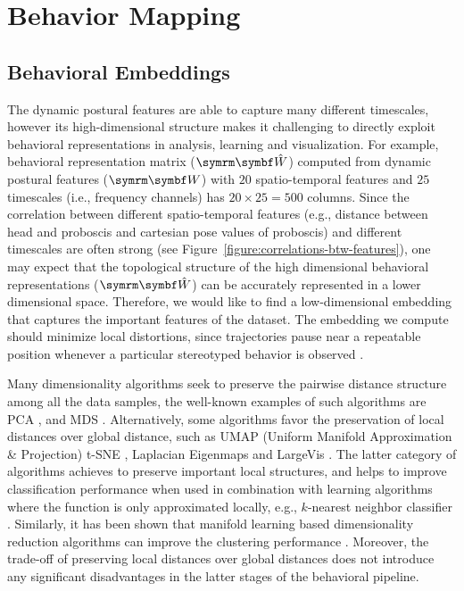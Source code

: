 \chapter{Behavior Mapping}

\section{Behavioral Embeddings}
The dynamic postural features are able to capture many different timescales, however its high-dimensional structure makes it challenging to directly exploit behavioral representations in analysis, learning and visualization.
For example, behavioral representation matrix ($\V{\hat{W}}$) computed from dynamic postural features ($\V{W}$) with $20$ spatio-temporal features and $25$ timescales (i.e., frequency channels) has $20 \times 25 {=} 500$ columns.
Since the correlation between different spatio-temporal features (e.g., distance between head and proboscis and cartesian pose values of proboscis) and different timescales are often strong (see Figure~\ref{figure:correlations-btw-features}), one may expect that the topological structure of the high dimensional behavioral representations ($\V{\hat{W}}$) can be accurately represented in a lower dimensional space.
Therefore, we would like to find a low-dimensional embedding that captures the important features of the dataset.
The embedding we compute should minimize local distortions, since trajectories pause near a repeatable position whenever a particular stereotyped behavior is observed \citep{berman_mapping_2014, deangelis_manifold_2019, ali_timecluster_2019}.

Many dimensionality algorithms seek to preserve the pairwise distance structure among all the data samples, the well-known examples of such algorithms are PCA \citep{hotelling_analysis_1933}, and MDS \citep{kruskal_multidimensional_1964}.
Alternatively, some algorithms favor the preservation of local distances over global distance, such as UMAP (Uniform Manifold Approximation \& Projection) \citep{mcinnes_umap_2020} t-SNE \citep{maaten_visualizing_2008}, Laplacian Eigenmaps \citep{belkin_laplacian_2003} and LargeVis \citep{tang_visualizing_2016}.
The latter category of algorithms achieves to preserve important local structures, and helps to improve classification performance when used in combination with learning algorithms where the function is only approximated locally, e.g., $k$-nearest neighbor classifier \citep{mcinnes_umap_2020}.
Similarly, it has been shown that manifold learning based dimensionality reduction algorithms can improve the clustering performance \citep{sainburg_parametric_2021}.
Moreover, the trade-off of preserving local distances over global distances does not introduce any significant disadvantages in the latter stages of the behavioral pipeline.

